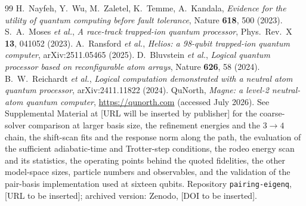 \documentclass[
  aps,            %
  prc,            %
  reprint,        %
  superscriptaddress,
  floatfix,
  nofootinbib
]{revtex4-2}
\begin{document}
\begin{thebibliography}{99}
H.~Nayfeh, Y.~Wu, M.~Zaletel, K.~Temme, A.~Kandala,
\textit{Evidence for the utility of quantum computing before fault tolerance},
Nature \textbf{618}, 500 (2023).
S.~A.~Moses \textit{et al.},
\textit{A race-track trapped-ion quantum processor},
Phys.\ Rev.\ X \textbf{13}, 041052 (2023).
A.~Ransford \textit{et al.},
\textit{Helios: a 98-qubit trapped-ion quantum computer},
arXiv:2511.05465 (2025).
D.~Bluvstein \textit{et al.},
\textit{Logical quantum processor based on reconfigurable atom arrays},
Nature \textbf{626}, 58 (2024).
B.~W.~Reichardt \textit{et al.},
\textit{Logical computation demonstrated with a neutral atom quantum processor},
arXiv:2411.11822 (2024).
QuNorth, \textit{Magne: a level-2 neutral-atom quantum computer},
\url{https://qunorth.com} (accessed July 2026).
 See Supplemental Material at [URL will be inserted by
publisher] for the coarse-solver comparison at larger basis size, the
refinement energies and the $3\to4$ chain, the shift-scan fits and the
response norm along the path, the evaluation of the sufficient
adiabatic-time and Trotter-step conditions, the rodeo energy scan and its
statistics, the operating points behind the quoted fidelities, the other
model-space sizes, particle numbers and observables, and the validation of
the pair-basis implementation used at sixteen qubits.
 Repository \texttt{pairing-eigenq}, [URL to be inserted];
archived version: Zenodo, [DOI to be inserted].
\end{thebibliography}
\end{document}
